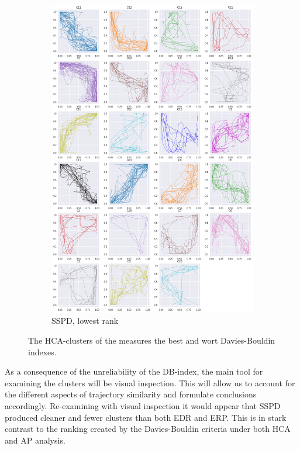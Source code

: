 \begin{figure}[h!]
\begin{subfigure}[c]{0.4\linewidth}
    \includegraphics[width=\linewidth]{figs/clusters/CLU_H_ALL[SSPD].png}
    \caption{SSPD, lowest rank}
  \end{subfigure}
  \caption{The HCA-clusters of the measures the best and wort Davies-Bouldin indexes.}
  \label{fig:cluster-best-worst-db-h}
\end{figure}



As a consequence of the unreliability of the DB-index, the main tool for examining the clusters will be visual inspection.
This will allow us to account for the different aspects of trajectory similarity and formulate conclusions accordingly. 
Re-examining  with visual inspection it would appear that SSPD produced cleaner and fewer clusters than both EDR and ERP. 
This is in stark contrast to the ranking created by the Davies-Bouldin criteria under both HCA and AP analysis. 


